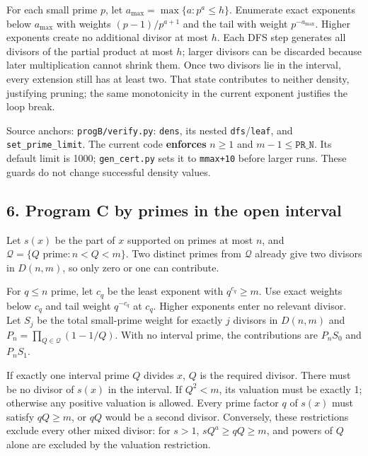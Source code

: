 \documentclass[
  11pt,
]{article}
\begin{document}
For each small prime \(p\), let \(a_{\max}=\max\{a:p^a\le h\}\).
Enumerate exact exponents below \(a_{\max}\) with weights
\((p-1)/p^{a+1}\) and the tail with weight \(p^{-a_{\max}}\). Higher
exponents create no additional divisor at most \(h\). Each DFS step
generates all divisors of the partial product at most \(h\); larger
divisors can be discarded because later multiplication cannot shrink
them. Once two divisors lie in the interval, every extension still has
at least two. That state contributes to neither density, justifying
pruning; the same monotonicity in the current exponent justifies the
loop break.

Source anchors: \texttt{progB/verify.py}: \texttt{dens}, its nested
\texttt{dfs}/\texttt{leaf}, and \texttt{set\_prime\_limit}. The current
code \textbf{enforces} \(n\ge1\) and \(m-1\le\texttt{PR\_N}\). Its
default limit is 1000; \texttt{gen\_cert.py} sets it to \texttt{mmax+10}
before larger runs. These guards do not change successful density
values.

\subsection{6. Program C by primes in the open
interval}\label{program-c-by-primes-in-the-open-interval}

Let \(s(x)\) be the part of \(x\) supported on primes at most \(n\), and
\(\mathcal Q=\{Q\text{ prime}:n<Q<m\}\). Two distinct primes from
\(\mathcal Q\) already give two divisors in \(D(n,m)\), so only zero or
one can contribute.

For \(q\le n\) prime, let \(c_q\) be the least exponent with
\(q^{c_q}\ge m\). Use exact weights below \(c_q\) and tail weight
\(q^{-c_q}\) at \(c_q\). Higher exponents enter no relevant divisor. Let
\(S_j\) be the total small-prime weight for exactly \(j\) divisors in
\(D(n,m)\) and \(P_n=\prod_{Q\in\mathcal Q}(1-1/Q)\). With no interval
prime, the contributions are \(P_nS_0\) and \(P_nS_1\).

If exactly one interval prime \(Q\) divides \(x\), \(Q\) is the required
divisor. There must be no divisor of \(s(x)\) in the interval. If
\(Q^2<m\), its valuation must be exactly 1; otherwise any positive
valuation is allowed. Every prime factor \(q\) of \(s(x)\) must satisfy
\(qQ\ge m\), or \(qQ\) would be a second divisor. Conversely, these
restrictions exclude every other mixed divisor: for \(s>1\),
\(sQ^a\ge qQ\ge m\), and powers of \(Q\) alone are excluded by the
valuation restriction.
\end{document}
